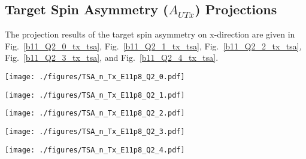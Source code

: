 \subsection{Target Spin Asymmetry ($A_{UTx}$) Projections}
 The projection results of the target spin asymmetry on x-direction are given in Fig.~\ref{b11_Q2_0_tx_tsa}, Fig.~\ref{b11_Q2_1_tx_tsa}, Fig.~\ref{b11_Q2_2_tx_tsa}, Fig.~\ref{b11_Q2_3_tx_tsa}, and Fig.~\ref{b11_Q2_4_tx_tsa}. 
 \begin{sidewaysfigure}
 \begin{center}
  \texttt{[image: ./figures/TSA\_n\_Tx\_E11p8\_Q2\_0.pdf]}
  \caption{\footnotesize{Transversely polarized target asymmetry ($A_{UTx}$) distributions distribution at $Q^{2}\sim 1.5~GeV^{2}$ with $E_{beam}=8.8~GeV~and~11~GeV$}}
  \label{b11_Q2_0_tx_tsa}
 \end{center}
\end{sidewaysfigure}
 \begin{sidewaysfigure}
 \begin{center}
  \texttt{[image: ./figures/TSA\_n\_Tx\_E11p8\_Q2\_1.pdf]}
  \caption{\footnotesize{Transversely polarized target asymmetry ($A_{UTx}$) distributions distribution at $Q^{2}\sim 2.5~GeV^{2}$ with $E_{beam}=8.8~GeV~and~11~GeV$}}
  \label{b11_Q2_1_tx_tsa}
 \end{center}
\end{sidewaysfigure}
 \begin{sidewaysfigure}
 \begin{center}
  \texttt{[image: ./figures/TSA\_n\_Tx\_E11p8\_Q2\_2.pdf]}
  \caption{\footnotesize{Transversely polarized target asymmetry ($A_{UTx}$) distributions distribution at $Q^{2}\sim 3.5~GeV^{2}$ with $E_{beam}=8.8~GeV~and~11~GeV$}}
  \label{b11_Q2_2_tx_tsa}
 \end{center}
\end{sidewaysfigure}
 \begin{sidewaysfigure}
 \begin{center}
  \texttt{[image: ./figures/TSA\_n\_Tx\_E11p8\_Q2\_3.pdf]}
  \caption{\footnotesize{Transversely polarized target asymmetry ($A_{UTx}$) distributions distribution at $Q^{2}\sim 4.5~GeV^{2}$ with $E_{beam}=8.8~GeV~and~11~GeV$}}
  \label{b11_Q2_3_tx_tsa}
 \end{center}
\end{sidewaysfigure}
 \begin{sidewaysfigure}
 \begin{center}
  \texttt{[image: ./figures/TSA\_n\_Tx\_E11p8\_Q2\_4.pdf]}
  \caption{\footnotesize{Transversely polarized target asymmetry ($A_{UTx}$) distributions distribution at $Q^{2}\sim 5.5~GeV^{2}$ with $E_{beam}=8.8~GeV~and~11~GeV$}}
  \label{b11_Q2_4_tx_tsa}
 \end{center}
\end{sidewaysfigure}

